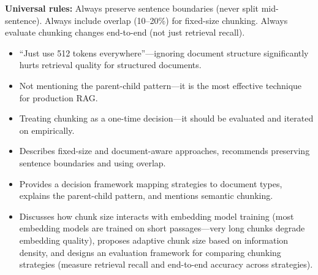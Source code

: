 \begin{interviewq}
\textbf{Universal rules:} Always preserve sentence boundaries (never split mid-sentence). Always include overlap (10--20\%) for fixed-size chunking. Always evaluate chunking changes end-to-end (not just retrieval recall).

\redflags
\begin{itemize}
    \item ``Just use 512 tokens everywhere''---ignoring document structure significantly hurts retrieval quality for structured documents.
    \item Not mentioning the parent-child pattern---it is the most effective technique for production RAG.
    \item Treating chunking as a one-time decision---it should be evaluated and iterated on empirically.
\end{itemize}


\goodgreat
\begin{itemize}
    \item {} Describes fixed-size and document-aware approaches, recommends preserving sentence boundaries and using overlap.
    \item {} Provides a decision framework mapping strategies to document types, explains the parent-child pattern, and mentions semantic chunking.
    \item {} Discusses how chunk size interacts with embedding model training (most embedding models are trained on short passages---very long chunks degrade embedding quality), proposes adaptive chunk size based on information density, and designs an evaluation framework for comparing chunking strategies (measure retrieval recall and end-to-end accuracy across strategies).
\end{itemize}

\end{interviewq}


